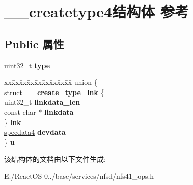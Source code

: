 \hypertarget{struct____createtype4}{}\section{\+\_\+\+\_\+createtype4结构体 参考}
\label{struct____createtype4}
\subsection*{Public 属性}
\begin{DoxyCompactItemize}
\item 
\mbox{\label{struct____createtype4_abd7664043cdfa344143904d7ef201641}} 
uint32\+\_\+t {\bfseries type}
\item 
\mbox{\label{struct____createtype4_aa48b8e762ae6f46ba724dfc7b65d54a1}} 
\begin{tabbing}
xx\=xx\=xx\=xx\=xx\=xx\=xx\=xx\=xx\=\kill
union \{\\
\>struct {\bfseries \_\_create\_type\_lnk} \{\\
\>\>uint32\_t {\bfseries linkdata\_len}\\
\>\>const char $\ast$ {\bfseries linkdata}\\
\>\} {\bfseries lnk}\\
\>\hyperlink{struct____specdata4}{specdata4} {\bfseries devdata}\\
\} {\bfseries u}\\

\end{tabbing}\end{DoxyCompactItemize}


该结构体的文档由以下文件生成\+:\begin{DoxyCompactItemize}
\item 
E\+:/\+React\+O\+S-\/0../base/services/nfsd/nfs41\+\_\+ops.\+h\end{DoxyCompactItemize}
